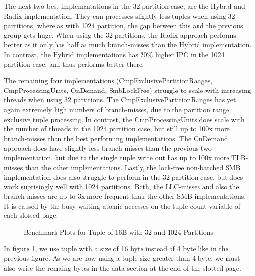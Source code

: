 The next two best implementations in the 32 partition case, are the Hybrid and Radix implementation.
They can processes slightly less tuples when using 32 partitions, where as with 1024 partition, the gap between this and the previous group gets huge.
When using the 32 partitions, the Radix approach performs better as it only has half as much branch-misses than the Hybrid implementation.
In contrast, the Hybrid implementations has 20\% higher \ac{IPC} in the 1024 partition case, and thus performs better there.

The remaining four implementations (CmpExclusivePartitionRanges, CmpProcessingUnits, OnDemand, SmbLockFree) struggle to scale with increasing threads when using 32 partitions.
The CmpExclusivePartitionRanges has yet again extremely high numbers of branch-misses, due to the partition range exclusive tuple processing.
In contrast, the CmpProcessingUnits does scale with the number of threads in the 1024 partition case, but still up to 100x more branch-misses than the best performing implementations.
The OnDemand approach does have slightly less branch-misses than the previous two implementation, but due to the single tuple write out has up to 100x more \ac{TLB}-misses than the other implementations.
Lastly, the lock-free non-batched \ac{SMB} implementation does also struggle to perform in the 32 partition case, but does work suprisingly well with 1024 partitions.
Both, the LLC-misses and also the branch-misses are up to 3x more frequent than the other \ac{SMB} implementations.
It is caused by the busy-waiting atomic accesses on the tuple-count variable of each slotted page.
\begin{figure}[h]
  \centering
  \begin{subfigure}{.49\textwidth}
    \centering
    \resizebox{\linewidth}{!}{}
  \end{subfigure}
  \begin{subfigure}{.49\textwidth}
    \centering
    \resizebox{\linewidth}{!}{}
  \end{subfigure}
  \caption[Shuffle Benchmark Plots for Tuple of 16B with 32 and 1024 Partitions]{Benchmark Plots for Tuple of 16B with 32 and 1024 Partitions}
  \label{plot-shuffle-16B-32-1024}
\end{figure}

In figure \ref{plot-shuffle-16B-32-1024}, we use tuple with a size of 16 byte instead of 4 byte like in the previous figure.
As we are now using a tuple size greater than 4 byte, we must also write the remaing bytes in the data section at the end of the slotted page.

